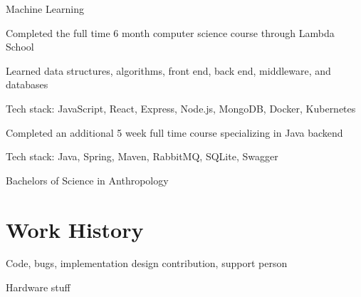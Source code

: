 \documentclass[letterpaper]{resume}
\begin{document}
\begin{compactitem}[\null]
\item Machine Learning
\end{compactitem}

\begin{compactitem}
\item Completed the full time 6 month computer science course through Lambda School
\item Learned data structures, algorithms, front end, back end, middleware, and databases
\item Tech stack: JavaScript, React, Express, Node.js, MongoDB, Docker, Kubernetes
\item Completed an additional 5 week full time course specializing in Java backend
\item Tech stack: Java, Spring, Maven, RabbitMQ, SQLite, Swagger
\end{compactitem}

\begin{compactitem}[\null]
\item Bachelors of Science in Anthropology
\end{compactitem}

\section{Work History}

\begin{compactitem}
\item Code, bugs, implementation design contribution, support person
\item Hardware stuff
\end{compactitem}
\end{document}
